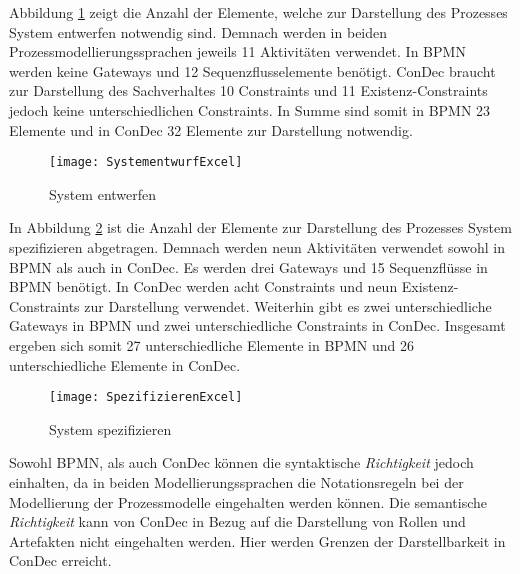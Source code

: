Abbildung \ref{fig:SystementwurfExcel} zeigt die Anzahl der Elemente, welche zur Darstellung des Prozesses System entwerfen notwendig sind. Demnach werden in beiden Prozessmodellierungssprachen jeweils 11 Aktivitäten verwendet. In BPMN werden keine Gateways und 12 Sequenzflusselemente benötigt. ConDec braucht zur Darstellung des Sachverhaltes 10 Constraints und 11 Existenz-Constraints jedoch keine unterschiedlichen Constraints. In Summe sind somit in BPMN 23 Elemente und in ConDec 32 Elemente zur Darstellung notwendig.\newline

\begin{figure}[!htbp]
\begin{center}
  \texttt{[image: SystementwurfExcel]} %
  \caption{System entwerfen}
  \label{fig:SystementwurfExcel}
\end{center}
\end{figure}

In Abbildung \ref{fig:SpezifizierenExcel} ist die Anzahl der Elemente zur Darstellung des Prozesses System spezifizieren abgetragen. Demnach werden neun Aktivitäten verwendet sowohl in BPMN als auch in ConDec. Es werden drei Gateways und 15 Sequenzflüsse in BPMN benötigt. In ConDec werden acht Constraints und neun Existenz-Constraints zur Darstellung verwendet. Weiterhin gibt es zwei unterschiedliche Gateways in BPMN und zwei unterschiedliche Constraints in ConDec. Insgesamt ergeben sich somit 27 unterschiedliche Elemente in BPMN und 26 unterschiedliche Elemente in ConDec. \newline

\begin{figure}[!htbp]
\begin{center}
  \texttt{[image: SpezifizierenExcel]} %
  \caption{System spezifizieren}
  \label{fig:SpezifizierenExcel}
\end{center}
\end{figure}

Sowohl BPMN, als auch ConDec können die syntaktische \textit{Richtigkeit} jedoch einhalten, da in beiden Modellierungssprachen die Notationsregeln bei der Modellierung der Prozessmodelle eingehalten werden können.\newline
Die semantische \textit{Richtigkeit} kann von ConDec in Bezug auf die Darstellung von Rollen und Artefakten nicht eingehalten werden. Hier werden Grenzen der Darstellbarkeit in ConDec erreicht.\newline

